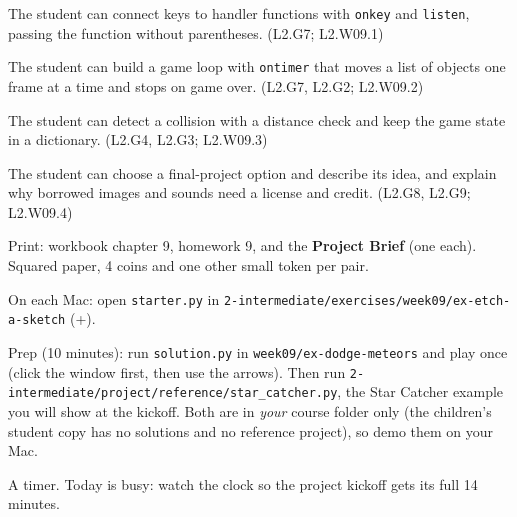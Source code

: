
\begin{objectives}
  \item The student can connect keys to handler functions with \texttt{onkey} and \texttt{listen}, passing the function without parentheses. (L2.G7; L2.W09.1)
  \item The student can build a game loop with \texttt{ontimer} that moves a list of objects one frame at a time and stops on game over. (L2.G7, L2.G2; L2.W09.2)
  \item The student can detect a collision with a distance check and keep the game state in a dictionary. (L2.G4, L2.G3; L2.W09.3)
  \item The student can choose a final-project option and describe its idea, and explain why borrowed images and sounds need a license and credit. (L2.G8, L2.G9; L2.W09.4)
\end{objectives}

\begin{materials}
  \item Print: workbook chapter 9, homework 9, and the \textbf{Project Brief} (one each). Squared paper, 4 coins and one other small token per pair.
  \item On each Mac: open \texttt{starter.py} in \texttt{2-intermediate/exercises/week09/ex-etch-a-sketch} (+).
  \item Prep (10 minutes): run \texttt{solution.py} in \texttt{week09/ex-dodge-meteors} and play once (click the window first, then use the arrows).
        Then run \texttt{2-intermediate/project/reference/star\_catcher.py}, the Star Catcher example you will show at the kickoff.
        Both are in \emph{your} course folder only (the children's student copy has no solutions and no reference project), so demo them on your Mac.
  \item A timer. Today is busy: watch the clock so the project kickoff gets its full 14 minutes.
\end{materials}


